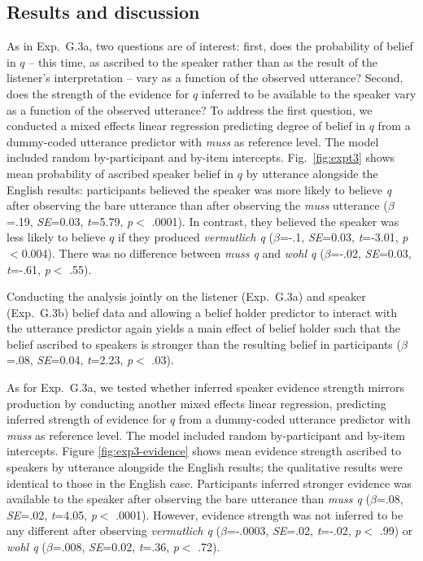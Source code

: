 \documentclass[11pt]{article}
\newcommand{\figref}[1]{Figure \ref{#1}}
\begin{document}
\subsection{Results and discussion}

As in Exp.~G.3a, two questions are of interest: first, does the probability of  belief in $q$ -- this time, as ascribed to the speaker rather than as the result of the listener's interpretation --  vary as a function of the observed utterance? Second, does the strength of the evidence for $q$ inferred to be available to the speaker vary as a function of the observed utterance? To address the first question, we conducted a mixed effects linear regression predicting degree of belief in $q$ from a dummy-coded utterance predictor with \emph{muss} as reference level. The model included random by-participant and by-item intercepts. Fig.~\ref{fig:expt3} shows mean probability of ascribed speaker belief in $q$ by utterance alongside the English results: participants believed the speaker was more likely to believe \emph{q}  after observing the bare utterance than after observing the \emph{muss} utterance   ($\beta$=.19, \emph{SE}=0.03, \emph{t}=5.79, \emph{p}$<$ .0001). In contrast, they believed the speaker was less likely to believe $q$ if they produced \emph{vermutlich q} ($\beta$=-.1, \emph{SE}=0.03, \emph{t}=-3.01, \emph{p}$<$0.004). There was no difference between \emph{muss q} and \emph{wohl q} ($\beta$=-.02, \emph{SE}=0.03, \emph{t}=-.61, \emph{p}$<$ .55). 

Conducting the analysis jointly on the listener (Exp.~G.3a) and speaker  (Exp.~G.3b) belief data and allowing a belief holder predictor to interact with the utterance predictor again yields a main effect of belief holder such that the belief ascribed to speakers is stronger than the resulting belief in participants ($\beta$=.08, \emph{SE}=0.04, \emph{t}=2.23, \emph{p}$<$ .03).

As for Exp.~G.3a, we tested whether inferred speaker evidence strength mirrors production by conducting another mixed effects linear regression, predicting inferred strength of evidence for $q$ from a dummy-coded utterance predictor with \emph{muss} as reference level. The model included random by-participant and by-item intercepts.  \figref{fig:exp3-evidence} shows mean evidence strength ascribed to speakers by utterance alongside the English results; the qualitative results were identical to those in the English case. Participants inferred stronger evidence was available to the speaker after observing the bare utterance than \emph{muss q} ($\beta$=.08, \emph{SE}=.02, \emph{t}=4.05, \emph{p}$<$ .0001). However, evidence strength was not inferred to be any different after observing \emph{vermutlich q} ($\beta$=-.0003, \emph{SE}=.02, \emph{t}=-.02, \emph{p}$<$ .99) or \emph{wohl q} ($\beta$=.008, \emph{SE}=0.02, \emph{t}=.36, \emph{p}$<$ .72).
\end{document}
